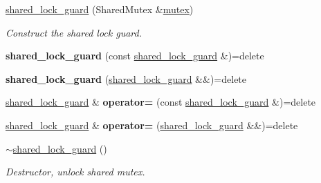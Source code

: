 \begin{DoxyCompactItemize}
\item 
\hyperlink{classcpen333_1_1process_1_1shared__lock__guard_a263fb59ac82aea8a400239ec7c238a14}{shared\+\_\+lock\+\_\+guard} (Shared\+Mutex \&\hyperlink{classcpen333_1_1process_1_1mutex}{mutex})
\begin{DoxyCompactList}\small\item\em Construct the shared lock guard. \end{DoxyCompactList}\item 
\mbox{\label{classcpen333_1_1process_1_1shared__lock__guard_ae6c65a188ca7c6816e0aca02b7f1da9c}} 
{\bfseries shared\+\_\+lock\+\_\+guard} (const \hyperlink{classcpen333_1_1process_1_1shared__lock__guard}{shared\+\_\+lock\+\_\+guard} \&)=delete
\item 
\mbox{\label{classcpen333_1_1process_1_1shared__lock__guard_a7cf99434f2fcf855153968a00ec9d8f9}} 
{\bfseries shared\+\_\+lock\+\_\+guard} (\hyperlink{classcpen333_1_1process_1_1shared__lock__guard}{shared\+\_\+lock\+\_\+guard} \&\&)=delete
\item 
\mbox{\label{classcpen333_1_1process_1_1shared__lock__guard_a7c611ab58320671b781a500cff2e6989}} 
\hyperlink{classcpen333_1_1process_1_1shared__lock__guard}{shared\+\_\+lock\+\_\+guard} \& {\bfseries operator=} (const \hyperlink{classcpen333_1_1process_1_1shared__lock__guard}{shared\+\_\+lock\+\_\+guard} \&)=delete
\item 
\mbox{\label{classcpen333_1_1process_1_1shared__lock__guard_a06012ba762fe1e7cd8077d938c68fa8a}} 
\hyperlink{classcpen333_1_1process_1_1shared__lock__guard}{shared\+\_\+lock\+\_\+guard} \& {\bfseries operator=} (\hyperlink{classcpen333_1_1process_1_1shared__lock__guard}{shared\+\_\+lock\+\_\+guard} \&\&)=delete
\item 
\mbox{\label{classcpen333_1_1process_1_1shared__lock__guard_a1099368d682a5cc3e2dbf553ec0e0dad}} 
\hyperlink{classcpen333_1_1process_1_1shared__lock__guard_a1099368d682a5cc3e2dbf553ec0e0dad}{$\sim$shared\+\_\+lock\+\_\+guard} ()
\begin{DoxyCompactList}\small\item\em Destructor, unlock shared mutex. \end{DoxyCompactList}\end{DoxyCompactItemize}


